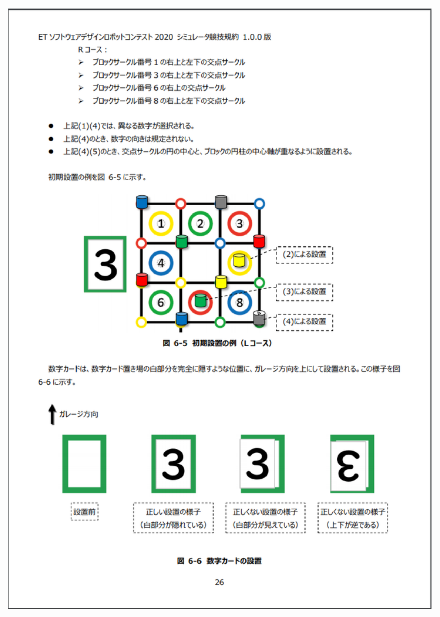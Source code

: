 \documentclass[uplatex, report, a4j, 10pt]{jsbook}
\begin{document}
\begin{figure}[tp]
    \begin{center}
    \includegraphics[width=\hsize]{specification/ET_13.eps}
    \end{center}
\end{figure}
\end{document}
